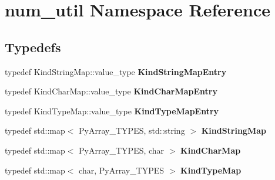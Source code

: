 \section{num\_\-util Namespace Reference}
\label{namespacenum__util}


\subsection*{Typedefs}
\begin{CompactItemize}
\item 
typedef Kind\-String\-Map::value\_\-type {\bf Kind\-String\-Map\-Entry}
\item 
typedef Kind\-Char\-Map::value\_\-type {\bf Kind\-Char\-Map\-Entry}
\item 
typedef Kind\-Type\-Map::value\_\-type {\bf Kind\-Type\-Map\-Entry}
\item 
typedef std::map$<$ Py\-Array\_\-TYPES, std::string $>$ {\bf Kind\-String\-Map}
\item 
typedef std::map$<$ Py\-Array\_\-TYPES, char $>$ {\bf Kind\-Char\-Map}
\item 
typedef std::map$<$ char, Py\-Array\_\-TYPES $>$ {\bf Kind\-Type\-Map}
\end{CompactItemize}
